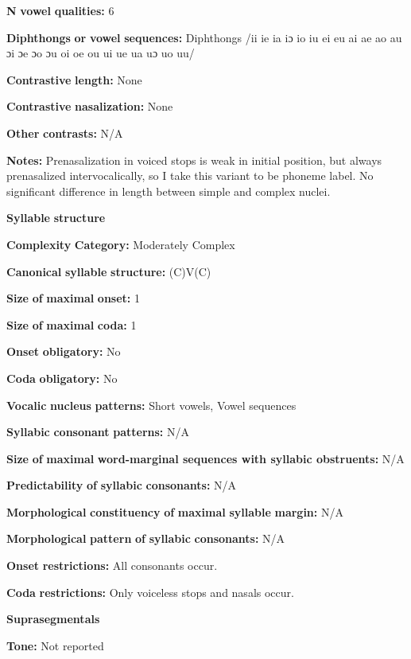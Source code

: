 \begin{styleBody}
\textbf{N} \textbf{vowel} \textbf{qualities:} 6

\textbf{Diphthongs} \textbf{or} \textbf{vowel} \textbf{sequences:} Diphthongs /ii ie ia iɔ io iu ei eu ai ae ao au ɔi ɔe ɔo ɔu oi oe ou ui ue ua uɔ uo uu/

\textbf{Contrastive} \textbf{length:} None

\textbf{Contrastive} \textbf{nasalization:} None

\textbf{Other} \textbf{contrasts:} N/A

\textbf{Notes:} Prenasalization in voiced stops is weak in initial position, but always prenasalized intervocalically, so I take this variant to be phoneme label. No significant difference in length between simple and complex nuclei.

\textbf{Syllable} \textbf{structure}

\textbf{Complexity} \textbf{Category:} Moderately Complex

\textbf{Canonical} \textbf{syllable} \textbf{structure:} (C)V(C) \citep[14-18]{McElhanon1970}

\textbf{Size} \textbf{of} \textbf{maximal} \textbf{onset:} 1

\textbf{Size} \textbf{of} \textbf{maximal} \textbf{coda:} 1

\textbf{Onset} \textbf{obligatory:} No

\textbf{Coda} \textbf{obligatory:} No

\textbf{Vocalic} \textbf{nucleus} \textbf{patterns:} Short vowels, Vowel sequences

\textbf{Syllabic} \textbf{consonant} \textbf{patterns:} N/A

\textbf{Size} \textbf{of} \textbf{maximal} \textbf{word{}-marginal sequences with syllabic obstruents:} N/A

\textbf{Predictability} \textbf{of} \textbf{syllabic} \textbf{consonants:} N/A

\textbf{Morphological} \textbf{constituency} \textbf{of} \textbf{maximal} \textbf{syllable} \textbf{margin:} N/A

\textbf{Morphological} \textbf{pattern} \textbf{of} \textbf{syllabic} \textbf{consonants:} N/A

\textbf{Onset} \textbf{restrictions:} All consonants occur.

\textbf{Coda} \textbf{restrictions:} Only voiceless stops and nasals occur.

\textbf{Suprasegmentals}

\textbf{Tone:} Not reported


\end{styleBody}

